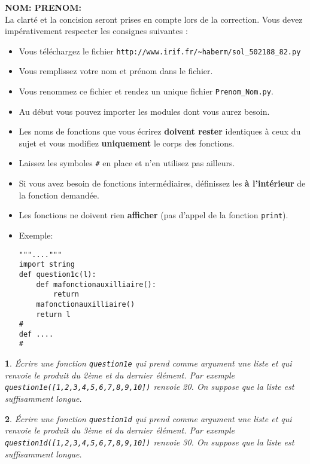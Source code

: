\documentclass[10pt]{article}
\newtheorem{exi}{}
\newenvironment{exo}{\begin{exi}\em}{\end{exi}}
\begin{document}
\vspace*{-1cm}

\noindent
{\bf NOM: \hspace*{5cm} PRENOM:}\\
\noindent
La clarté et la concision seront prises en compte lors de la correction.
Vous devez impérativement respecter les consignes suivantes :
\begin{itemize}
\item Vous téléchargez le fichier \verb+http://www.irif.fr/~haberm/sol_502188_82.py+
        \item Vous remplissez votre nom et prénom dans le fichier.
	\item Vous renommez ce fichier et rendez un unique fichier
              {\tt Prenom\_Nom.py}. 
        \item Au début vous pouvez importer les modules dont vous aurez besoin.
	\item Les noms de fonctions que vous écrirez {\bf doivent rester}
	  identiques à ceux du sujet et vous modifiez {\bf uniquement}
          le corps des fonctions.
          \item Laissez les symboles \verb+#+ en place
          et n'en utilisez pas ailleurs.
        \item Si vous avez besoin de fonctions intermédiaires, définissez les
{\bf à l'intérieur} de la fonction demandée.
        \item Les fonctions ne doivent rien {\bf afficher} (pas d'appel de la fonction \verb+print+).
\item Exemple:
\begin{verbatim}
"""...."""
import string
def question1c(l):
    def mafonctionauxilliaire(): 
        return
    mafonctionauxilliaire() 
    return l
#
def ....
#
\end{verbatim}
\end{itemize}
\begin{exo}
    Écrire une fonction {\tt question1e} qui prend comme argument une liste et
qui renvoie le produit du 2ème et du dernier élément. Par exemple
\verb+question1e([1,2,3,4,5,6,7,8,9,10])+ renvoie 20.
On suppose que la liste est suffisamment longue.
\end{exo}
\begin{exo}
    Écrire une fonction {\tt question1d} qui prend comme argument une liste et
qui renvoie le produit du 3ème et du dernier élément. Par exemple
\verb+question1d([1,2,3,4,5,6,7,8,9,10])+ renvoie 30.
On suppose que la liste est suffisamment longue.
\end{exo}
\end{document}

